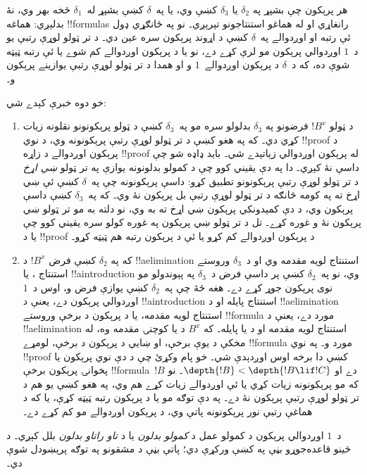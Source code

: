 \documentclass[../../../include/open-logic-section]{subfiles}
\begin{document}
هر پرېکون چې بشپړ په $\delta_2$ يا $\delta_3$ کښې وي، يا
په~$\delta$ کښې بشپړ له~$\delta_1$ څخه بهر وي، نۀ بدلېږي:
هماغه !!{formula}s رانغاړي او له هماغو استنتاجونو تېرېږي۔ نو
په ځانګړي ډول ئې رتبه او اوږدوالے په~$\delta$ کښې د اړوند
پرېکون سره عين دي۔ د تر ټولو لوړې رتبې يو د~$1$ اوږدوالي
پرېکون مو لرې کړے دے، نو يا د پرېکون اوږدوالے کم شوے يا ئې
رتبه ټيټه شوې ده، که د~$\delta$ د پرېکون اوږدوالے~$1$ و او
همدا د تر ټولو لوړې رتبې يوازينے پرېکون و۔

خو دوه خبرې کېدے شي:
\begin{enumerate}
  \item د ټولو $!B^x$ فرضونو په $\delta_3$ بدلولو سره مو
  په~$\delta_3$ کښې د ټولو پرېکونونو نقلونه زيات کړي دي۔ که په
  هغو کښې د تر ټولو لوړې رتبې پرېکونونه وي، د نوي !!{proof} د
  پرېکون اوږدوالے د زاړه !!{proof} له پرېکون اوږدوالي زياتېدے
  شي۔ بايد ډاډه شو چې داسې نۀ کېږي۔ دا په دې يقيني کوو چې د
  کمولو بدلونونه يوازې په تر ټولو \emph{ښي اړخ} د تر ټولو لوړې
  رتبې پرېکونونو تطبيق کړو: داسې پرېکونونه چې په~$\delta$ کښې
  ئې ښي اړخ ته په کومه څانګه د تر ټولو لوړې رتبې بل پرېکون نۀ
  وي۔ که په~$\delta_3$ کښې داسې پرېکون وي، د دې کمېدونکي
  پرېکون ښي اړخ ته به وي، نو دلته به مو تر ټولو ښي پرېکون نۀ
  و غوره کړے۔ تل د تر ټولو ښي پرېکون په غوره کولو سره يقيني
  کوو چې يا د !!{proof} د پرېکون اوږدوالے کم کړو يا ئې د پرېکون
  رتبه هم ټيټه کړو۔
  \item که په $\delta_2$ کښې فرض $!B^x$ د !!a{elimination}
  استنتاج لويه مقدمه وي او د~$\delta_3$ وروستے استنتاج
  \Elim{\lor}، \Elim{\lexists} يا !!a{introduction} وي، نو
  په~$\delta_2$ کښې پر داسې فرض د~$\delta_3$ په پېوندولو مو
  نوی پرېکون جوړ کړے دے۔ هغه څۀ چې په~$\delta_2$ کښې يوازې
  فرض و، اوس د~$1$ اوږدوالي پرېکون دے، يعنې د
  !!a{introduction} استنتاج پايله او د !!a{elimination} استنتاج
  لويه مقدمه، يا د پرېکون د برخې وروستے !!{formula} مورد دے،
  يعنې د !!a{elimination} استنتاج لويه مقدمه او د \Elim{\lor}
  يا \Elim{\lexists} پايله۔ که $B^x$ د \Elim{\lor} يا
  \Elim{\lexists} کوچنۍ مقدمه وه، له مخکې د يوې برخې، او ښايي
  د پرېکون د برخې، لومړے !!{formula} مورد و۔ په نوي !!{proof}
  کښې دا برخه اوس اوږدېدې شي۔ خو پام وکړئ چې د دې نوي پرېکون
  يا پخوانۍ پرېکون برخې !!{formula}~$!B$ دے او
  $\depth{!B} < \depth{!B \lif !C}$۔ نو که مو پرېکونونه زيات
  کړي يا ئې اوږدوالے زيات کړے هم وي، په هغو کښې يو هم د تر
  ټولو لوړې رتبې پرېکون نۀ دے۔ په دې توګه مو يا د پرېکون رتبه
  ټيټه کړې، يا که د هماغې رتبې نور پرېکونونه پاتې وي، د پرېکون
  اوږدوالے مو کم کړے دے۔
\end{enumerate}

د~$1$ اوږدوالي پرېکون د کمولو عمل د \emph{کمولو بدلون}
يا د \emph{تاو راتاو بدلون} بلل کېږي۔ د ځينو قاعده‌جوړو بڼې
په  کښې ورکړې دي؛ پاتې بڼې د
مشقونو په توګه پرېښودل شوې دي۔
\end{document}
